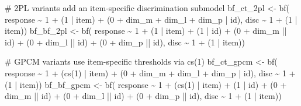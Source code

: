\documentclass[
  man,
  floatsintext,
  longtable,
  nolmodern,
  notxfonts,
  notimes,
  colorlinks=true,linkcolor=blue,citecolor=blue,urlcolor=blue]{apa7}
\newenvironment{Shaded}{\begin{snugshade}}{\end{snugshade}}
\newcommand{\CommentTok}[1]{\textcolor[rgb]{0.37,0.37,0.37}{#1}}
\newcommand{\DecValTok}[1]{\textcolor[rgb]{0.68,0.00,0.00}{#1}}
\newcommand{\FunctionTok}[1]{\textcolor[rgb]{0.28,0.35,0.67}{#1}}
\newcommand{\NormalTok}[1]{\textcolor[rgb]{0.00,0.23,0.31}{#1}}
\newcommand{\OtherTok}[1]{\textcolor[rgb]{0.00,0.23,0.31}{#1}}
\newcommand{\SpecialCharTok}[1]{\textcolor[rgb]{0.37,0.37,0.37}{#1}}
\begin{document}
\begin{Shaded}
\begin{Highlighting}[]
\CommentTok{\# 2PL variants add an item{-}specific discrimination submodel}
\NormalTok{bf\_ct\_2pl }\OtherTok{\textless{}{-}} \FunctionTok{bf}\NormalTok{(}
\NormalTok{  response }\SpecialCharTok{\textasciitilde{}} \DecValTok{1} \SpecialCharTok{+}\NormalTok{ (}\DecValTok{1} \SpecialCharTok{|}\NormalTok{ item) }\SpecialCharTok{+}\NormalTok{ (}\DecValTok{0} \SpecialCharTok{+}\NormalTok{ dim\_m }\SpecialCharTok{+}\NormalTok{ dim\_l }\SpecialCharTok{+}\NormalTok{ dim\_p }\SpecialCharTok{|}\NormalTok{ id),}
\NormalTok{  disc }\SpecialCharTok{\textasciitilde{}} \DecValTok{1} \SpecialCharTok{+}\NormalTok{ (}\DecValTok{1} \SpecialCharTok{|}\NormalTok{ item))}
\NormalTok{bf\_bf\_2pl }\OtherTok{\textless{}{-}} \FunctionTok{bf}\NormalTok{(}
\NormalTok{  response }\SpecialCharTok{\textasciitilde{}} \DecValTok{1} \SpecialCharTok{+}\NormalTok{ (}\DecValTok{1} \SpecialCharTok{|}\NormalTok{ item) }\SpecialCharTok{+}\NormalTok{ (}\DecValTok{1} \SpecialCharTok{|}\NormalTok{ id) }\SpecialCharTok{+}
\NormalTok{    (}\DecValTok{0} \SpecialCharTok{+}\NormalTok{ dim\_m }\SpecialCharTok{||}\NormalTok{ id) }\SpecialCharTok{+}\NormalTok{ (}\DecValTok{0} \SpecialCharTok{+}\NormalTok{ dim\_l }\SpecialCharTok{||}\NormalTok{ id) }\SpecialCharTok{+}\NormalTok{ (}\DecValTok{0} \SpecialCharTok{+}\NormalTok{ dim\_p }\SpecialCharTok{||}\NormalTok{ id),}
\NormalTok{  disc }\SpecialCharTok{\textasciitilde{}} \DecValTok{1} \SpecialCharTok{+}\NormalTok{ (}\DecValTok{1} \SpecialCharTok{|}\NormalTok{ item))}

\CommentTok{\# GPCM variants use item{-}specific thresholds via cs(1)}
\NormalTok{bf\_ct\_gpcm }\OtherTok{\textless{}{-}} \FunctionTok{bf}\NormalTok{(}
\NormalTok{  response }\SpecialCharTok{\textasciitilde{}} \DecValTok{1} \SpecialCharTok{+}\NormalTok{ (}\FunctionTok{cs}\NormalTok{(}\DecValTok{1}\NormalTok{) }\SpecialCharTok{|}\NormalTok{ item) }\SpecialCharTok{+}\NormalTok{ (}\DecValTok{0} \SpecialCharTok{+}\NormalTok{ dim\_m }\SpecialCharTok{+}\NormalTok{ dim\_l }\SpecialCharTok{+}\NormalTok{ dim\_p }\SpecialCharTok{|}\NormalTok{ id),}
\NormalTok{  disc }\SpecialCharTok{\textasciitilde{}} \DecValTok{1} \SpecialCharTok{+}\NormalTok{ (}\DecValTok{1} \SpecialCharTok{|}\NormalTok{ item))}
\NormalTok{bf\_bf\_gpcm }\OtherTok{\textless{}{-}} \FunctionTok{bf}\NormalTok{(}
\NormalTok{  response }\SpecialCharTok{\textasciitilde{}} \DecValTok{1} \SpecialCharTok{+}\NormalTok{ (}\FunctionTok{cs}\NormalTok{(}\DecValTok{1}\NormalTok{) }\SpecialCharTok{|}\NormalTok{ item) }\SpecialCharTok{+}\NormalTok{ (}\DecValTok{1} \SpecialCharTok{|}\NormalTok{ id) }\SpecialCharTok{+}
\NormalTok{    (}\DecValTok{0} \SpecialCharTok{+}\NormalTok{ dim\_m }\SpecialCharTok{||}\NormalTok{ id) }\SpecialCharTok{+}\NormalTok{ (}\DecValTok{0} \SpecialCharTok{+}\NormalTok{ dim\_l }\SpecialCharTok{||}\NormalTok{ id) }\SpecialCharTok{+}\NormalTok{ (}\DecValTok{0} \SpecialCharTok{+}\NormalTok{ dim\_p }\SpecialCharTok{||}\NormalTok{ id),}
\NormalTok{  disc }\SpecialCharTok{\textasciitilde{}} \DecValTok{1} \SpecialCharTok{+}\NormalTok{ (}\DecValTok{1} \SpecialCharTok{|}\NormalTok{ item))}


\end{Highlighting}
\end{Shaded}
\end{document}
